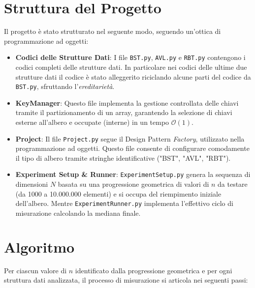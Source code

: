 \documentclass[10pt]{article}
\begin{document}
\section{Struttura del Progetto}
Il progetto è stato strutturato nel seguente modo, seguendo un'ottica di programmazione ad oggetti:
\begin{itemize}
    \item \textbf{Codici delle Strutture Dati}: I file \texttt{BST.py}, \texttt{AVL.py} e \texttt{RBT.py} contengono i codici completi delle strutture dati. In particolare nei codici delle ultime due strutture dati il codice è stato alleggerito riciclando alcune parti del codice da \texttt{BST.py}, sfruttando l'\textit{ereditarietà}.
    \item \textbf{KeyManager}: Questo file implementa la gestione controllata delle chiavi tramite il partizionamento di un array, garantendo la selezione di chiavi esterne all'albero e occupate (interne) in un tempo $\mathcal{O}(1)$.
    \item \textbf{Project}: Il file \texttt{Project.py} segue il Design Pattern \textit{Factory}, utilizzato nella programmazione ad oggetti. Questo file consente di configurare comodamente il tipo di albero tramite stringhe identificative ("BST", "AVL", "RBT").
    \item \textbf{Experiment Setup \& Runner}: \texttt{ExperimentSetup.py} genera la sequenza di dimensioni $N$ basata su una progressione geometrica di valori di $n$ da testare (da 1000 a 10.000.000 elementi) e si occupa del riempimento iniziale dell'albero. Mentre \texttt{ExperimentRunner.py} implementa l'effettivo ciclo di misurazione calcolando la mediana finale.
\end{itemize}

\section{Algoritmo}
Per ciascun valore di $n$ identificato dalla progressione geometrica e per ogni struttura dati analizzata, il processo di misurazione si articola nei seguenti passi:
\end{document}
